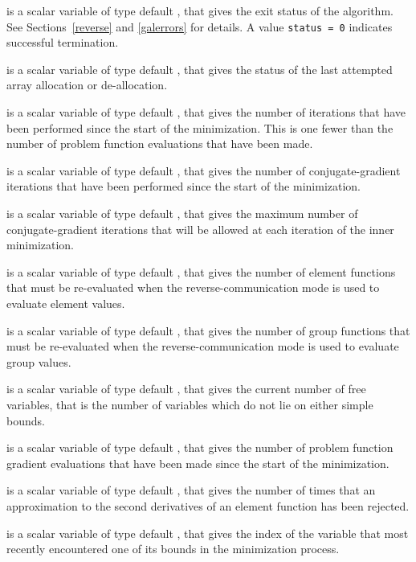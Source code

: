 \documentclass{galahad}
\begin{document}
\begin{description}
 is a scalar variable of type default \integer, that gives the
exit status of the algorithm. See Sections~\ref{reverse} and
\ref{galerrors} for details. A value {\tt status = 0} indicates
successful termination.

 is a scalar variable of type default \integer, that gives
the status of the last attempted array allocation or de-allocation.

 is a scalar variable of type default \integer, that gives
the number of iterations that have been performed since the start of the
minimization. This is one fewer than the number of
problem function evaluations that have been made.

 is a scalar variable of type default \integer, that gives
the number of conjugate-gradient iterations that have
been performed since the start of the minimization.

 is a scalar variable of type default \integer, that gives
the maximum number of conjugate-gradient iterations that will be allowed
at each iteration of the inner minimization.

 is a scalar variable of type default \integer, that gives
the number of element functions that must be re-evaluated when the
reverse-communication mode is used to evaluate element values.

 is a scalar variable of type default \integer, that gives
the number of group functions that must be re-evaluated when the
reverse-communication mode is used to evaluate group values.

 is a scalar variable of type default \integer, that gives
the current number of free variables, that is the number of variables
which do not lie on either simple bounds.

 is a scalar variable of type default \integer, that gives
the number of problem function gradient evaluations that have
been made since the start of the minimization.

 is a scalar variable of type default \integer, that gives
the number of times that an approximation to the
second derivatives of an element function has been rejected.

 is a scalar variable of type default \integer, that gives
the index of the variable that most recently
encountered one of its bounds in the minimization process.


\end{description}
\end{document}
